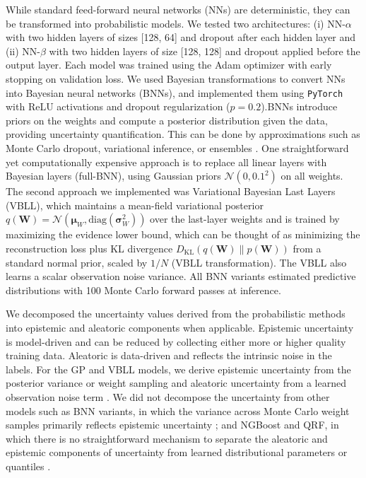 \documentclass[pdflatex,sn-basic]{sn-jnl}%
\theoremstyle{thmstyleone}%
\theoremstyle{thmstyletwo}%
\theoremstyle{thmstylethree}%
\begin{document}
While standard feed-forward neural networks (NNs) are deterministic, they can be transformed into probabilistic models. We tested two architectures: (i) NN-$\alpha$ with two hidden layers of sizes [128, 64] and dropout after each hidden layer and (ii) NN-$\beta$ with two hidden layers of size [128, 128] and dropout applied before the output layer. Each model was trained using the Adam optimizer with early stopping on validation loss. We used Bayesian transformations to convert NNs into Bayesian neural networks (BNNs), and implemented them using \texttt{PyTorch} \citep{pytorchGeometric} with ReLU activations and dropout regularization ($p=0.2$).BNNs introduce priors on the weights and compute a posterior distribution given the data, providing uncertainty quantification. This can be done by approximations such as Monte Carlo dropout, variational inference, or ensembles \citep{gal2016}. One straightforward yet computationally expensive approach is to replace all linear layers with Bayesian layers (full-BNN), using Gaussian priors $\mathcal{N}(0, 0.1^2)$ on all weights. The second approach we implemented was Variational Bayesian Last Layers (VBLL), which maintains a mean-field variational posterior $q(\mathbf{W}) = \mathcal{N}(\boldsymbol{\mu}_W, \text{diag}(\boldsymbol{\sigma}_W^2))$ over the last-layer weights and is trained by maximizing the evidence lower bound, which can be thought of as minimizing the reconstruction loss plus KL divergence $D_{\text{KL}}(q(\mathbf{W}) \| p(\mathbf{W}))$ from a standard normal prior, scaled by $1/N$ \citep{Harrison2024} (VBLL transformation). The VBLL also learns a scalar observation noise variance. All BNN variants estimated predictive distributions with 100 Monte Carlo forward passes at inference.

We decomposed the uncertainty values derived from the probabilistic methods into epistemic and aleatoric components when applicable. Epistemic uncertainty is model-driven and can be reduced by collecting either more or higher quality training data. Aleatoric is data-driven and reflects the intrinsic noise in the labels. For the GP and VBLL models, we derive epistemic uncertainty from the posterior variance or weight sampling and aleatoric uncertainty from a learned observation noise term \citep{Rasmussen2005, Harrison2024}. We did not decompose the uncertainty from other models such as BNN variants, in which the variance across Monte Carlo weight samples primarily reflects epistemic uncertainty \citep{kendall2017, gal2016}; and NGBoost and QRF, in which there is no straightforward mechanism to separate the aleatoric and epistemic components of uncertainty from learned distributional parameters or quantiles \citep{Duan2020, Meinshausen2006}.
\end{document}
